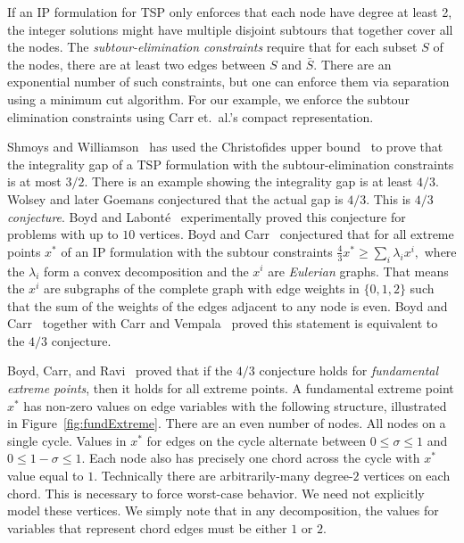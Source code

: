 \documentclass[11pt]{article}
\begin{document}
If an IP formulation for TSP only enforces that each node have degree
at least 2, the integer solutions might have multiple disjoint
subtours that together cover all the nodes.  The {\em
subtour-elimination constraints} require that for each subset $S$ of
the nodes, there are at least two edges between $S$ and $\bar{S}$.
There are an exponential number of such constraints, but one can
enforce them via separation using a minimum cut algorithm.  For our
example, we enforce the subtour elimination constraints using Carr
et.\ al.'s compact representation\cite{CarrKLNP07}.

Shmoys and Williamson~\cite{ShmoysWilliamson} has used the
Christofides upper bound~\cite{Christofides76} to prove that the
integrality gap of a TSP formulation with the subtour-elimination
constraints is at most $3/2$.  There is an example showing the
integrality gap is at least $4/3$. Wolsey and later Goemans
conjectured that the actual gap is $4/3$.  This is {\em $4/3$
conjecture}.  Boyd and Labont\'{e}~\cite{BoydLabonte} experimentally
proved this conjecture for problems with up to $10$ vertices.  Boyd
and Carr~\cite{BoydCarr} conjectured that for all extreme points $x^*$
of an IP formulation with the subtour constraints $\frac{4}{3}x^* \ge
\sum_i \lambda_i x^i,$ where the $\lambda_i$ form a convex
decomposition and the $x^i$ are {\em Eulerian} graphs.  That means the
$x^i$ are subgraphs of the complete graph with edge weights in
$\{0,1,2\}$ such that the sum of the weights of the edges adjacent to
any node is even.  Boyd and Carr~\cite{BoydCarr} together with Carr
and Vempala~\cite{CarrVempala} proved this statement is equivalent to
the $4/3$ conjecture.

Boyd, Carr, and Ravi~\cite{BoydCarr,CarrRavi} proved that if the $4/3$
conjecture holds for {\em fundamental extreme points}, then it holds
for all extreme points.  A fundamental extreme point $x^*$ has
non-zero values on edge variables with the following structure,
illustrated in Figure~\ref{fig:fundExtreme}.  There are an even number
of nodes.  All nodes on a single cycle.  Values in $x^*$ for edges on
the cycle alternate between $0 \le \sigma \le 1$ and $0 \le 1 - \sigma
\le 1$.  Each node also has precisely one chord across the cycle with
$x^*$ value equal to $1$.  Technically there are arbitrarily-many
degree-$2$ vertices on each chord.  This is necessary to force
worst-case behavior.  We need not explicitly model these vertices.  We
simply note that in any decomposition, the values for variables that
represent chord edges must be either $1$ or $2$.
\end{document}
